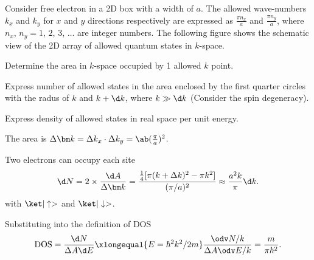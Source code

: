 \begin{wrapstuff}[width = .32\linewidth, lines = 6]
\end{wrapstuff}
\begin{problem}
  Consider free electron in a 2D box with a width of $a$.
  The allowed wave-numbers $k_x$ and $k_y$ for $x$ and $y$ directions
  respectively are expressed as $\frac{\pi n_x}a$ and $\frac{\pi n_y}{a}$,
  where $n_x$, $n_y = 1$, $2$, $3$, $\ldots$ are integer numbers.
  The following figure shows the schematic view of the 2D array of
  allowed quantum states in $k$-space.
  \wrapstuffclear
  \begin{enumext}[label = (\alph*)]
    \item Determine the area in $k$-space occupied by 1 allowed $k$ point.
    \item Express number of allowed states in the area enclosed
    by the first quarter circles with the radus of $k$ and $k + \d k$,
    where $k \gg \d k$ (Consider the spin degeneracy).
    \item Express density of allowed states in real space per unit energy.
  \end{enumext}
\end{problem}
\begin{solution}\leavevmode
  \begin{enumext}[label = (\alph*)]
    \item The area is
    $\Delta\bm k = \Delta k_x \cdot \Delta k_y = \ab(\frac\pi a)^2$.
    \item Two electrons can occupy each site
    \[
      \d N = 2 \times \frac{\d A}{\Delta \bm k}
    = \frac{\frac14[\pi(k + \Delta k)^2 - \pi k^2]}{(\pi/a)^2}
    \approx \frac{a^2k}{\pi}\d k.
    \]
    with $\ket|\uparrow>$ and $\ket|\downarrow>$.
    \item Substituting into the definition of DOS
    \[
      \text{DOS} = \frac{\d N}{\Delta A \d E}
      \xlongequal{E = \hbar^2k^2/2m} \frac{\odv N/k}{\Delta A \odv E/k}
    = \frac{m}{\pi \hbar^2}.
    \]
  \end{enumext}
\end{solution}

